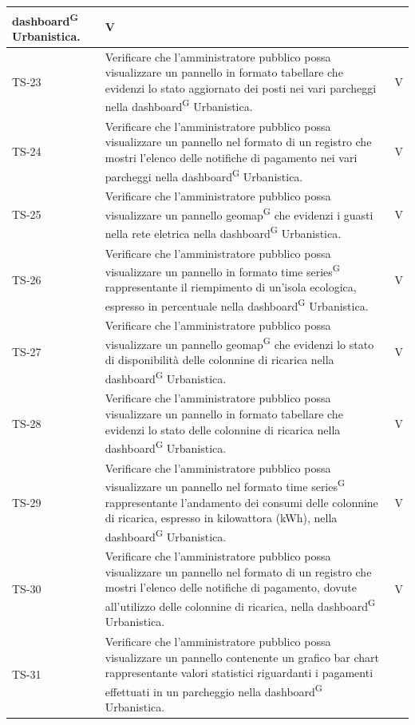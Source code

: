 \documentclass[8pt]{article}
\newcommand{\glossterm}[1]{#1\textsuperscript{G}} %
\begin{document}
\begin{longtable}{|>{\centering}p{2cm}|>{\RaggedRight}m{12cm}|>{\centering\arraybackslash}p{2cm}|}
    \glossterm{dashboard} Urbanistica. & V \\
    \hline
    TS-23 & Verificare che l'amministratore pubblico possa visualizzare un pannello in formato tabellare che evidenzi lo stato aggiornato dei posti nei vari parcheggi nella
    \glossterm{dashboard} Urbanistica. & V \\
    \hline
    TS-24 & 
    Verificare che l'amministratore pubblico possa visualizzare un pannello nel formato di un registro che mostri l'elenco delle notifiche di pagamento nei vari parcheggi nella \glossterm{dashboard} Urbanistica.& V \\
    \hline
    TS-25 & 
    Verificare che l'amministratore pubblico possa visualizzare un pannello \glossterm{geomap} che evidenzi i guasti nella rete eletrica nella \glossterm{dashboard} Urbanistica.& V \\
    \hline
    TS-26 & 
    Verificare che l'amministratore pubblico possa visualizzare un pannello in formato \glossterm{time series} rappresentante il riempimento di un'isola ecologica, espresso in percentuale nella \glossterm{dashboard} Urbanistica.& V \\
    \hline
    TS-27 & 
    Verificare che l'amministratore pubblico possa visualizzare un pannello \glossterm{geomap} che evidenzi lo stato di disponibilità delle colonnine di ricarica nella \glossterm{dashboard} Urbanistica.& V \\
    \hline
    TS-28 & 
    Verificare che l'amministratore pubblico possa visualizzare un pannello in formato tabellare che evidenzi lo stato delle colonnine di ricarica nella \glossterm{dashboard} Urbanistica.& V \\
    \hline
    TS-29 & 
    Verificare che l'amministratore pubblico possa visualizzare un pannello nel formato \glossterm{time series} rappresentante l'andamento dei consumi delle colonnine di ricarica, espresso in kilowattora (kWh), nella \glossterm{dashboard} Urbanistica.& V \\
    \hline
    TS-30 & 
    Verificare che l'amministratore pubblico possa visualizzare un pannello nel formato di un registro che mostri l'elenco delle notifiche di pagamento, dovute all'utilizzo delle colonnine di ricarica, nella \glossterm{dashboard} Urbanistica.& V \\
    \hline
    TS-31 & Verificare che l'amministratore pubblico possa visualizzare un pannello contenente
    un grafico bar chart rappresentante valori statistici riguardanti i pagamenti effettuati in un parcheggio nella \glossterm{dashboard} Urbanistica.

\end{longtable}
\end{document}
